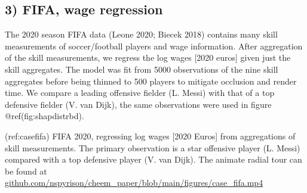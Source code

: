 \documentclass[
]{article}
\begin{document}
\hypertarget{fifa-wage-regression}{%
\subsection{3) FIFA, wage regression}\label{fifa-wage-regression}}

The 2020 season FIFA data (Leone 2020; Biecek 2018) contains many skill
measurements of soccer/football players and wage information. After
aggregation of the skill measurements, we regress the log wages {[}2020
euros{]} given just the skill aggregates. The model was fit from 5000
observations of the nine skill aggregates before being thinned to 500
players to mitigate occlusion and render time. We compare a leading
offensive fielder (L. Messi) with that of a top defensive fielder (V.
van Dijk), the same observations were used in figure
@ref(fig:shapdistrbd).

(ref:casefifa) FIFA 2020, regressing log wages {[}2020 Euros{]} from
aggregations of skill measurements. The primary observation is a star
offensive player (L. Messi) compared with a top defensive player (V. van
Dijk). The animate radial tour can be found at
\href{https://github.com/nspyrison/cheem_paper/blob/main/figures/case_fifa.mp4}{github.com/nspyrison/cheem\_paper/blob/main/figures/case\_fifa.mp4}
\end{document}
